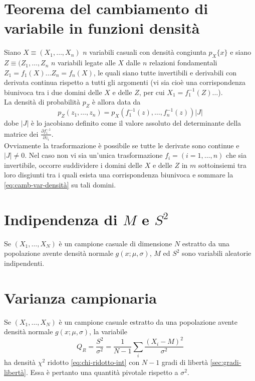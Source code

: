 \section{Teorema del cambiamento di variabile in funzioni densità} %
\label{sec:cambiamento-var-densità}
Siano $X\equiv(X_1,\dots ,X_n)$ $n$ variabili casuali con densità congiunta $p_{X}\{x\}$ e siano $Z\equiv(Z_1,\dots ,Z_n$ $n$ variabili legate alle $X$ dalle $n$ relazioni fondamentali \\ $Z_1=f_1(X) \dots Z_n=f_n(X)$, le quali siano tutte invertibili e derivabili con derivata continua rispetto a tutti gli argomenti (vi sia cioè una corrispondenza biunivoca tra i due domini delle $X$ e delle $Z$, per cui $X_1=f_{1}^{-1}(Z) \dots$). \\ La densità di probabilità $p_Z$ è allora data da
\begin{equation}
\label{eq:camb-var-densità}
p_{ Z }\left( z_{ 1 },\dots ,z_{ n } \right) =p_{ X }\left( f_{ 1 }^{ -1 }\left( z \right) ,\dots ,f_{ n }^{ -1 }\left( z \right)  \right) \left| J \right| 
\end{equation}
dobe $|J|$ è lo jacobiano definito come il valore assoluto del determinante della matrice dei $\frac { \partial f_{ i }^{ -1 } }{ \partial z_{ i } } $. \\Ovviamente la trasformazione è possibile se tutte le derivate sono continue e $|J|\neq 0$. Nel caso non vi sia un'unica trasformazione $f_i=(i=1,\dots ,n)$ che sia invertibile, occorre suddividere i domini delle $X$ e delle $Z$ in $m$ sottoinsiemi tra loro disgiunti tra i quali esista una corrispondenza biunivoca e sommare la \ref{eq:camb-var-densità} su tali domini.

\section{Indipendenza di $M$ e $S^2$} %
\label{sec:indip-media-var}
Se $\left( { X }_{ 1 },\dots ,{ X }_{ N } \right) $ è un campione casuale di dimensione $N$ estratto da una popolazione avente densità normale $g\left( x;\mu ,\sigma  \right) $, $M$ ed $S^2$ sono variabili aleatorie indipendenti.

\section{Varianza campionaria} %
\label{sec:varianza-campionaria}
Se $\left( { X }_{ 1 },\dots ,{ X }_{ N } \right)$ è un campione casuale estratto da una popolazione avente densità normale $g\left( x;\mu ,\sigma  \right) $, la variabile
\begin{equation}
{ Q }_{ R }=\frac { { S }^{ 2 } }{ { \sigma  }^{ 2 } } =\frac { 1 }{ N-1 } \sum _{ i }{ \frac { { \left( { X }_{ i }-M \right)  }^{ 2 } }{ { \sigma  }^{ 2 } }  } 
\end{equation}
ha densità $\chi^2$ ridotto \ref{eq:chi-ridotto-int} con $N-1$ gradi di libertà \ref{sec:gradi-libertà}. Essa è pertanto una quantità pivotale rispetto a $\sigma^2$.